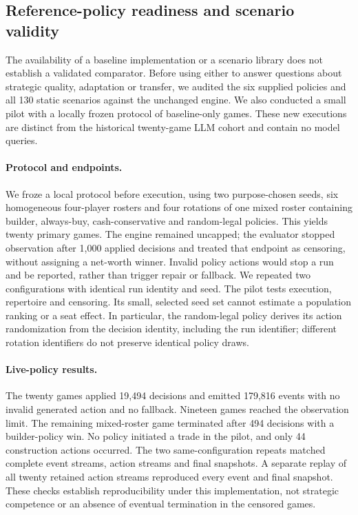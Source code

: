 \subsection{Reference-policy readiness and scenario validity}
\label{sec:agenda-reference-readiness}

The availability of a baseline implementation or a scenario library does not establish a validated comparator. Before using either to answer questions about strategic quality, adaptation or transfer, we audited the six supplied policies and all 130 static scenarios against the unchanged engine. We also conducted a small pilot with a locally frozen protocol of baseline-only games. These new executions are distinct from the historical twenty-game LLM cohort and contain no model queries.

\paragraph{Protocol and endpoints.}
We froze a local protocol before execution, using two purpose-chosen seeds, six homogeneous four-player rosters and four rotations of one mixed roster containing builder, always-buy, cash-conservative and random-legal policies. This yields twenty primary games. The engine remained uncapped; the evaluator stopped observation after 1,000 applied decisions and treated that endpoint as censoring, without assigning a net-worth winner. Invalid policy actions would stop a run and be reported, rather than trigger repair or fallback. We repeated two configurations with identical run identity and seed. The pilot tests execution, repertoire and censoring. Its small, selected seed set cannot estimate a population ranking or a seat effect. In particular, the random-legal policy derives its action randomization from the decision identity, including the run identifier; different rotation identifiers do not preserve identical policy draws.

\paragraph{Live-policy results.}
The twenty games applied 19,494 decisions and emitted 179,816 events with no invalid generated action and no fallback. Nineteen games reached the observation limit. The remaining mixed-roster game terminated after 494 decisions with a builder-policy win. No policy initiated a trade in the pilot, and only 44 construction actions occurred. The two same-configuration repeats matched complete event streams, action streams and final snapshots. A separate replay of all twenty retained action streams reproduced every event and final snapshot. These checks establish reproducibility under this implementation, not strategic competence or an absence of eventual termination in the censored games.

